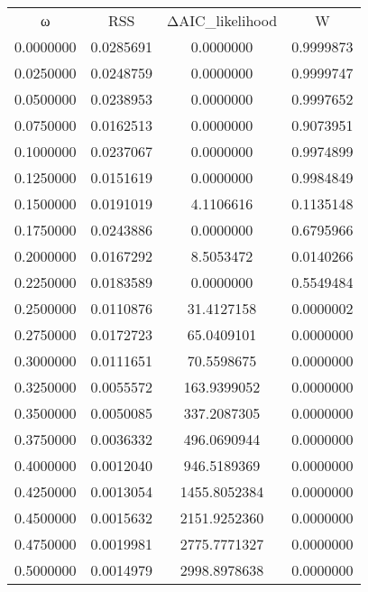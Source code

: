 \begin{tabular}{cccc}
ω & RSS & ΔAIC_likelihood & W\\
0.0000000 & 0.0285691 & 0.0000000 & 0.9999873\\
0.0250000 & 0.0248759 & 0.0000000 & 0.9999747\\
0.0500000 & 0.0238953 & 0.0000000 & 0.9997652\\
0.0750000 & 0.0162513 & 0.0000000 & 0.9073951\\
0.1000000 & 0.0237067 & 0.0000000 & 0.9974899\\
0.1250000 & 0.0151619 & 0.0000000 & 0.9984849\\
0.1500000 & 0.0191019 & 4.1106616 & 0.1135148\\
0.1750000 & 0.0243886 & 0.0000000 & 0.6795966\\
0.2000000 & 0.0167292 & 8.5053472 & 0.0140266\\
0.2250000 & 0.0183589 & 0.0000000 & 0.5549484\\
0.2500000 & 0.0110876 & 31.4127158 & 0.0000002\\
0.2750000 & 0.0172723 & 65.0409101 & 0.0000000\\
0.3000000 & 0.0111651 & 70.5598675 & 0.0000000\\
0.3250000 & 0.0055572 & 163.9399052 & 0.0000000\\
0.3500000 & 0.0050085 & 337.2087305 & 0.0000000\\
0.3750000 & 0.0036332 & 496.0690944 & 0.0000000\\
0.4000000 & 0.0012040 & 946.5189369 & 0.0000000\\
0.4250000 & 0.0013054 & 1455.8052384 & 0.0000000\\
0.4500000 & 0.0015632 & 2151.9252360 & 0.0000000\\
0.4750000 & 0.0019981 & 2775.7771327 & 0.0000000\\
0.5000000 & 0.0014979 & 2998.8978638 & 0.0000000\\
\end{tabular}
